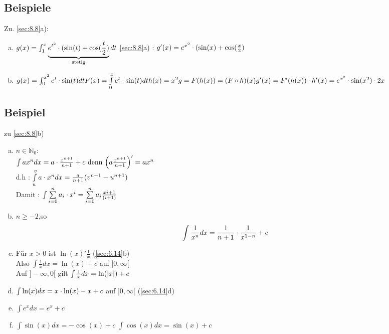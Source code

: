 \subsection{Beispiele}
Zu. \ref{sec:8.8}a):
\begin{enumerate}[a)]
\item $g(x) = \int_{1}^{x} \underbrace{e^{t^2} \cdot (\sin(t) + \cos(\frac{t}{2})}_{\text{stetig}} dt$
\ref{sec:8.8}a) : $g'(x) = e^{x^2} \cdot (\sin(x) + \cos(\frac{x}{2})$
\item $g(x) = \int_{0}^{x^2} e^t \cdot \sin(t)dt\\
F(x) = \int\limits_{0}^{x} e^t \cdot \sin(t)dt\\
h(x) = x^2\\
g = F(h(x)) = (F \circ h)(x)\\
g'(x) = F'(h(x)) \cdot h'(x) = e^{x^2} \cdot \sin(x^2) \cdot 2x$\\
\end{enumerate}
\subsection{Beispiel}
zu \ref{sec:8.8}b)
\begin{enumerate}[a)]
\item $n \in \mathbb{N}_0$:\\
$ \int a x^n dx = a \cdot \frac{x^{n+1}}{n+1} + c \text{ denn } \Bigl(a\frac{x^{n+1}}{n+1}\Bigr)' = ax^n$\\
d.h : $\int\limits_{u}^{v} a \cdot x^n dx = \frac{a}{n+1} (v^{n+1} - u^{n+1})$\\
Damit : $\int \sum\limits_{i=0}^{n} a_i \cdot x^i = \sum\limits_{i=0}^{n} a_i \frac{x{i+1}}{(i+1)}$
\item $n \ge -2$,so \[ \int \frac{1}{x^n} dx = \frac{1}{n+1} \cdot \frac{1}{x^{1-n}} +c \]
\item Für $ x > 0$ ist $\ln(x)' \frac{1}{x}$ \hfill (\ref{sec:6.14}b)\\
Also $\int \frac{1}{x} dx = \ln(x) + c$ auf $]0,\infty[$\\
Auf $]-\infty,0[$ gilt $\int \frac{1}{x}dx = \ln(\lvert x \rvert) +c$
\item $\int \ln(x)dx = x \cdot \ln(x) - x + c$ auf $]0,\infty[$ \hfill (\ref{sec:6.14}d)
\item $\int e^x dx = e^x+c$
\item $\int \sin(x)dx = -\cos(x) +c$
$\int \cos(x) dx = \sin(x) +c$
\end{enumerate}
